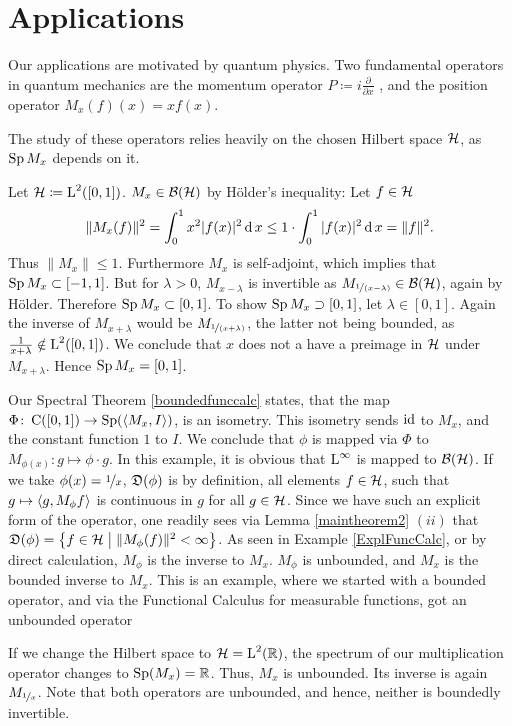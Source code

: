 \section{Applications}

Our applications are motivated by quantum physics. Two fundamental operators
in quantum mechanics are the momentum operator $P\coloneqq 
i \frac{\partial}{\partial x}$
, and the position operator $M_x(f)(x) = xf(x)$. 

\begin{rem}
The study of these operators relies heavily on the chosen Hilbert space $\mathcal{H}$, 
as $\operatorname{Sp} M_x$ depends on it.
\end{rem}
\begin{expl}\label{ExplMult}
 

Let $\mathcal{H} \coloneqq \text{L}^2(\left[ 0, 1 \right])$. $M_x \in \mathcal{B}(\mathcal{H})$ by Hölder's 
inequality: Let $f \in \mathcal{H}$
\[
 \| M_x(f) \|^2 = \int _0 ^1 x^2 | f(x)|^2 \operatorname{d} x \leq 
 1 \cdot \int _0 ^1 | f(x) |^2 \operatorname{d} x = \| f \| ^2.
\]
Thus $\| M_x\| \leq 1$. Furthermore $M_x$ is self-adjoint, which implies that
$\operatorname{Sp} M_x \subset \left[ -1 , 1 \right]$. But for $\lambda > 0$,
$M_{x-\lambda}$ is invertible as $M_{\nicefrac{1}{(x - \lambda)}} \in \mathcal{B}(\mathcal{H})$, again by
Hölder. Therefore $\operatorname{Sp} M_x \subset \left[ 0, 1\right]$. To show 
$\operatorname{Sp} M_x \supset \left[ 0, 1\right]$, let $\lambda \in  \left[ 0, 1\right]$.
Again the inverse of $M_{x+ \lambda}$ would be $M_{\nicefrac{1}{(x + \lambda)}}$,
the latter not being bounded, as $\frac{1}{x + \lambda} \notin 
\text{L}^2(\left[ 0, 1\right])$. We conclude that $x$ does not a have a preimage
in $\mathcal{H}$ under $M_{x + \lambda}$. Hence $\operatorname{Sp} M_x = \left[ 0 , 1\right]$.

Our Spectral Theorem \ref{boundedfunccalc} states, that the map
$\Phi \colon \operatorname{C}(\left[0, 1\right]) \to \operatorname{Sp} (\left\langle M_x, I \right\rangle)$, is an isometry. This 
isometry sends $\operatorname{id}$ to $M_x$, and the constant function $1$ to $I$.
We conclude that $\phi$ is mapped via $\Phi$ to 
$M_{\phi(x)}\colon g \mapsto \phi \cdot g$. In this example, it is obvious that
$\text{L}^\infty$ is mapped to $\mathcal{B}(\mathcal{H})$. If we take $\phi(x) = \nicefrac{1}{x}$, 
$\mathfrak{D}(\phi)$ is by definition, all elements $f \in \mathcal{H}$, such that
$g \mapsto \left\langle g, M_\phi f \right\rangle$ is continuous in $g$ for all $g \in \mathcal{H}$.
Since we have such an explicit form of the operator, one readily sees via 
Lemma \ref{maintheorem2} $(ii)$ that
$\mathfrak{D}(\phi) = \left\lbrace f \in \mathcal{H} \bigm | \|M_\phi (f)\|^2 < \infty \right\rbrace$.
As seen in Example \ref{ExplFuncCalc}, or by direct calculation, 
$M_\phi$ is the inverse to $M_x$. $M_\phi$ is unbounded, and $M_x$ is 
the bounded inverse to $M_x$. This is an example, where we started with
a bounded operator, and via the Functional Calculus for measurable 
functions, got an unbounded operator

If we change the Hilbert space to $\mathcal{H} = \text{L}^2 (\mathbb{R})$, the spectrum
of our multiplication operator changes to $\operatorname{Sp}(M_x) = \mathbb{R}$. Thus, $M_x$ 
is unbounded. Its inverse is again $M_{\nicefrac{1}{x}}$. Note that 
both operators are unbounded, and hence, neither is boundedly invertible.
\end{expl}

